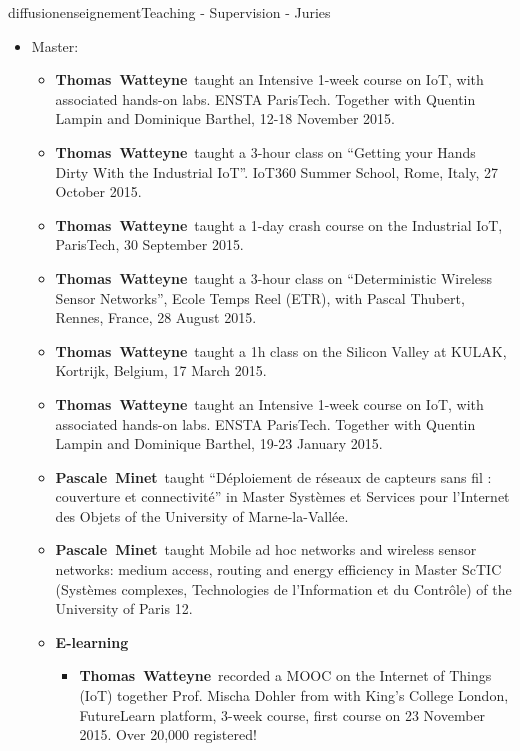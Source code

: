\documentclass{ra2016}
\newcommand{\pascale} {\textbf{Pascale~Minet}}
\newcommand{\thomas}  {\textbf{Thomas~Watteyne}}
\begin{document}
\begin{module}{diffusion}{enseignement}{Teaching - Supervision - Juries}
\begin{itemize}
    \item Master:
        \begin{itemize}
            \item \thomas~taught an Intensive 1-week course on IoT, with associated hands-on labs. ENSTA ParisTech. Together with Quentin Lampin and Dominique Barthel, 12-18 November 2015.
            \item \thomas~taught a 3-hour class on ``Getting your Hands Dirty With the Industrial IoT''. IoT360 Summer School, Rome, Italy, 27 October 2015.
            \item \thomas~taught a 1-day crash course on the Industrial IoT, ParisTech, 30 September 2015.
            \item \thomas~taught a 3-hour class on ``Deterministic Wireless Sensor Networks'', Ecole Temps Reel (ETR), with Pascal Thubert, Rennes, France, 28 August 2015.
            \item \thomas~taught a 1h class on the Silicon Valley at KULAK, Kortrijk, Belgium, 17 March 2015.
            \item \thomas~taught an Intensive 1-week course on IoT, with associated hands-on labs. ENSTA ParisTech. Together with Quentin Lampin and Dominique Barthel,  19-23 January 2015.
            \item \pascale~taught ``D\'eploiement de r\'eseaux de capteurs sans fil : couverture et connectivit\'e'' in Master Syst\`emes et Services pour l'Internet des Objets of the University of Marne-la-Vall\'ee.
            \item \pascale~taught Mobile ad hoc networks and wireless sensor networks: medium access, routing and energy efficiency in Master ScTIC (Syst\`emes complexes, Technologies de l'Information et du Contr\^ole) of the University of Paris 12.
            \item \textbf{E-learning}  
                \begin{itemize}
                    \item \thomas~recorded a MOOC on the Internet of Things (IoT) together Prof. Mischa Dohler from with King's College London, FutureLearn platform, 3-week course, first course on 23 November 2015. Over 20,000 registered!
                \end{itemize}
        \end{itemize}
\end{itemize}




\end{module}
\end{document}
